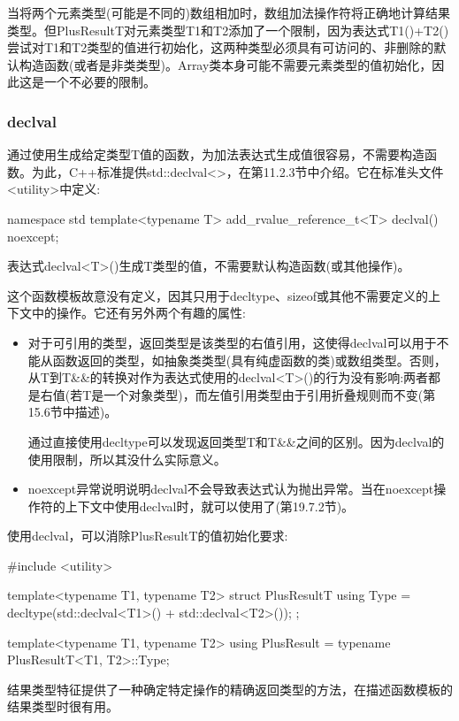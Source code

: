 当将两个元素类型(可能是不同的)数组相加时，数组加法操作符将正确地计算结果类型。但PlusResultT对元素类型T1和T2添加了一个限制，因为表达式T1()+T2()尝试对T1和T2类型的值进行初始化，这两种类型必须具有可访问的、非删除的默认构造函数(或者是非类类型)。Array类本身可能不需要元素类型的值初始化，因此这是一个不必要的限制。

\subsubsection{declval}

通过使用生成给定类型T值的函数，为加法表达式生成值很容易，不需要构造函数。为此，C++标准提供std::declval<>，在第11.2.3节中介绍。它在标准头文件<utility>中定义:

\begin{cpp}
namespace std {
	template<typename T>
	add_rvalue_reference_t<T> declval() noexcept;
}
\end{cpp}

表达式declval<T>()生成T类型的值，不需要默认构造函数(或其他操作)。

这个函数模板故意没有定义，因其只用于decltype、sizeof或其他不需要定义的上下文中的操作。它还有另外两个有趣的属性:

\begin{itemize}
\item 
对于可引用的类型，返回类型是该类型的右值引用，这使得declval可以用于不能从函数返回的类型，如抽象类类型(具有纯虚函数的类)或数组类型。否则，从T到T\&\&的转换对作为表达式使用的declval<T>()的行为没有影响:两者都是右值(若T是一个对象类型)，而左值引用类型由于引用折叠规则而不变(第15.6节中描述)。

\begin{notice}
通过直接使用decltype可以发现返回类型T和T\&\&之间的区别。因为declval的使用限制，所以其没什么实际意义。
\end{notice}

\item 
noexcept异常说明说明declval不会导致表达式认为抛出异常。当在noexcept操作符的上下文中使用declval时，就可以使用了(第19.7.2节)。
\end{itemize}

使用declval，可以消除PlusResultT的值初始化要求:

\begin{cpp}
#include <utility>

template<typename T1, typename T2>
struct PlusResultT {
	using Type = decltype(std::declval<T1>() + std::declval<T2>());
};

template<typename T1, typename T2>
using PlusResult = typename PlusResultT<T1, T2>::Type;
\end{cpp}

结果类型特征提供了一种确定特定操作的精确返回类型的方法，在描述函数模板的结果类型时很有用。




















